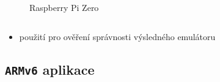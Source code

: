 \documentclass[compress]{beamer}
\begin{document}
\begin{frame}
\begin{columns}
\begin{figure}
			\caption{Raspberry Pi Zero}
			\label{Raspberry Pi Zero}
		\end{figure}
	\end{columns}
	\vspace{0.2cm}
	\noindent\makebox[\linewidth]{\rule{\textwidth}{0.4pt}}
	\vspace{-0.4cm}
	\begin{itemize}
		\item<7-> použití \href{https://github.com/MartinUbl/KIV-RTOS}{} pro ověření správnosti výsledného emulátoru
	\end{itemize}
\end{frame}

\subsection{\texttt{ARMv6} aplikace}
\end{document}
